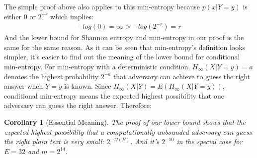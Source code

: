 \documentclass[10pt, conference, compsocconf]{IEEEtran}
\newtheorem{mycor}{Corollary}
\begin{document}
    The simple proof above also applies to this min-entropy
    because $p(x | Y = y)$ is either $0$ or $2^{-r}$ which implies:
    \begin{align*}
        -log(0) = \infty > -log(2^{-r}) = r
    \end{align*}
    And the lower bound for Shannon entropy and min-entropy
    in our proof is the same for the same reason.
    As it can be seen that min-entropy's definition looks simpler,
    it's easier to find out the meaning of the lower
    bound for conditional min-entropy. For min-entropy with a deterministic condition,
    $H_\infty(X | Y = y) = a$
    denotes the highest probability $2^{-a}$ that adversary can achieve to guess
    the right answer when $Y = y$ is known.
    Since $H_\infty(X | Y) = E\left(H_\infty(X | Y = y)\right)$,
    conditional min-entropy means the expected highest
    possibility that one adversary can guess the right answer.
    Therefore:
    \begin{mycor}[Essential Meaning]
    The proof of our lower bound shows that
    the expected highest possibility that a computationally-unbounded
    adversary can guess the right plain text is very small: $2^{-\Omega(E)}$.
    And it's $2^{-10}$ in the special case for $E = 32$ and $m = 2^{14}$.
    \end{mycor}
%
%
\end{document}
